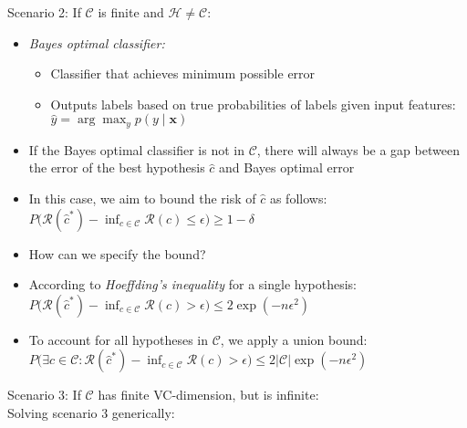 Scenario 2: If $\mathcal{C}$ is finite and $\mathcal{H} \neq \mathcal{C}$:
\begin{itemize}
    \item \emph{Bayes optimal classifier:}
    \begin{itemize}
        \item Classifier that achieves minimum possible error
        \item Outputs labels based on true probabilities of labels given input features:
        $
        \hat{y} = \arg\max_y p(y \mid \boldsymbol{x})
        $
    \end{itemize}
    \item If the Bayes optimal classifier is not in $\mathcal{C}$, there will always be a gap between the error of the best hypothesis $\hat{c}$ and Bayes optimal error
    \item In this case, we aim to bound the risk of $\hat{c}$ as follows:
    $
    P\big(\mathcal{R}(\hat{c}^*) - \inf_{c \in \mathcal{C}} \mathcal{R}(c) \leq \epsilon\big) \geq 1 - \delta
    $
    \item How can we specify the bound?
    \item According to \emph{Hoeffding's inequality} for a single hypothesis:
    $
    P\big(\mathcal{R}(\hat{c}^*) - \inf_{c \in \mathcal{C}} \mathcal{R}(c) > \epsilon\big) \leq 2 \exp(-n \epsilon^2)
    $
    \item To account for all hypotheses in $\mathcal{C}$, we apply a union bound:
    $
    P\big(\exists c \in \mathcal{C}: \mathcal{R}(\hat{c}^*) - \inf_{c \in \mathcal{C}} \mathcal{R}(c) > \epsilon\big) \leq 2 |\mathcal{C}| \exp(-n \epsilon^2)
    $
\end{itemize}
Scenario 3: If $\mathcal{C}$ has finite VC-dimension, but is infinite:\\
Solving scenario 3 generically:
